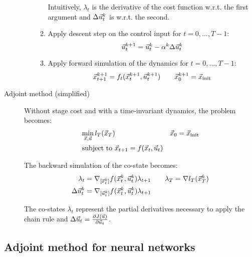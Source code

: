 \begin{description}
\begin{enumerate}
\begin{enumerate}
                \begin{remark}
                    Intuitively, $\lambda_t$ is the derivative of the cost function w.r.t. the first argument and $\Delta {\vec{u}}_t^k$ is w.r.t. the second.
                \end{remark}

                \item Apply descent step on the control input for $t = 0, \dots, T-1$:
                \[
                    {\vec{u}}_{t}^{k+1} = {\vec{u}}_{t}^{k} - \alpha^k \Delta {\vec{u}}_t^k
                \]
                \item Apply forward simulation of the dynamics for $t = 0, \dots, T-1$:
                \[
                    {\vec{x}}_{t+1}^{k+1} = f_t({\vec{x}}_t^{k+1}, {\vec{u}}_t^{k+1})
                    \qquad
                    {\vec{x}}_0^{k+1} = {\vec{x}}_\text{init}
                \]
            \end{enumerate}
        \end{enumerate}

    \item[Adjoint method (simplified)] 
        Without stage cost and with a time-invariant dynamics, the problem becomes:
        \[
            \begin{aligned}
                &\min_{{\vec{x}}, {\vec{u}}} l_T({\vec{x}}_T) && {\vec{x}}_0 = {\vec{x}}_\text{init} \\
                &\,\text{subject to } {\vec{x}}_{t+1} = f({\vec{x}}_t, {\vec{u}}_t)
            \end{aligned}
        \]

        The backward simulation of the co-state becomes:
        \[
            \begin{split}
                \lambda_t &= \nabla_{[{\vec{x}}_t^k]} f({\vec{x}}_t^k, {\vec{u}}_t^k) \lambda_{t+1}
                \qquad 
                \lambda_T = \nabla l_T({\vec{x}}_T^k) \\
                \Delta {\vec{u}}_t^k &= \nabla_{[{\vec{u}}_t^k]} f({\vec{x}}_t^k, {\vec{u}}_t^k) \lambda_{t+1}
            \end{split}
        \]

        \begin{remark}
            The co-states $\lambda_t$ represent the partial derivatives necessary to apply the chain rule and $\Delta{\vec{u}}_t = \frac{\partial J({\vec{u}})}{\partial {\vec{u}}_t}$.
        \end{remark}
\end{description}


\subsection{Adjoint method for neural networks}

